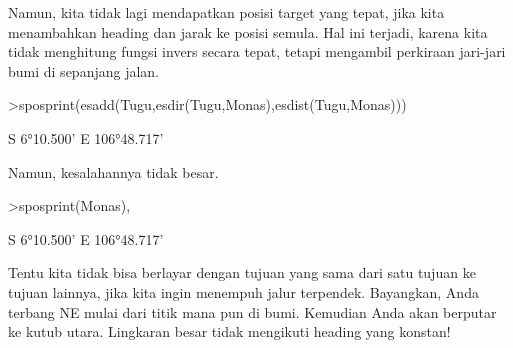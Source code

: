 \documentclass[a4paper,10pt]{article}
\begin{document}
\begin{eulernotebook}
\begin{eulercomment}
\begin{eulercomment}
\begin{eulercomment}
Namun, kita tidak lagi mendapatkan posisi target yang tepat, jika kita
menambahkan heading dan jarak ke posisi semula. Hal ini terjadi,
karena kita tidak menghitung fungsi invers secara tepat, tetapi
mengambil perkiraan jari-jari bumi di sepanjang jalan.
\end{eulercomment}
\begin{eulerprompt}
>sposprint(esadd(Tugu,esdir(Tugu,Monas),esdist(Tugu,Monas)))
\end{eulerprompt}
\begin{euleroutput}
  S 6°10.500' E 106°48.717'
\end{euleroutput}
\begin{eulercomment}
Namun, kesalahannya tidak besar.
\end{eulercomment}
\begin{eulerprompt}
>sposprint(Monas),
\end{eulerprompt}
\begin{euleroutput}
  S 6°10.500' E 106°48.717'
\end{euleroutput}
\begin{eulercomment}
Tentu kita tidak bisa berlayar dengan tujuan yang sama dari satu
tujuan ke tujuan lainnya, jika kita ingin menempuh jalur terpendek.
Bayangkan, Anda terbang NE mulai dari titik mana pun di bumi. Kemudian
Anda akan berputar ke kutub utara. Lingkaran besar tidak mengikuti
heading yang konstan!


\end{eulercomment}
\end{eulercomment}
\end{eulercomment}
\end{eulernotebook}
\end{document}
